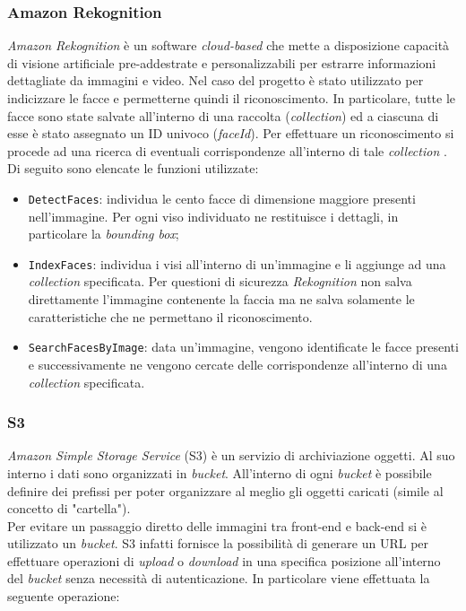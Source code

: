 	\subsubsection{Amazon Rekognition}
	
	\emph{Amazon Rekognition} è un software \emph{cloud-based} che mette a disposizione capacità di visione artificiale pre-addestrate e personalizzabili per estrarre informazioni dettagliate da immagini e video. Nel caso del progetto è stato utilizzato per indicizzare le facce e permetterne quindi il riconoscimento. In particolare, tutte le facce sono state salvate all'interno di una raccolta (\emph{collection}) ed a ciascuna di esse è stato assegnato un ID univoco (\emph{faceId}). Per effettuare un riconoscimento si procede ad una ricerca di eventuali corrispondenze all'interno di tale \emph{collection} . \\
	Di seguito sono elencate le funzioni utilizzate:
	\begin{itemize}
		\item \texttt{DetectFaces}: individua le cento facce di dimensione maggiore presenti nell'immagine. Per ogni viso individuato ne restituisce i dettagli, in particolare la \emph{bounding box};
		\item \texttt{IndexFaces}: individua i visi all'interno di un'immagine e li aggiunge ad una \emph{collection} specificata. Per questioni di sicurezza \emph{Rekognition} non salva direttamente l'immagine contenente la faccia ma ne salva solamente le caratteristiche che ne permettano il riconoscimento.
		\item \texttt{SearchFacesByImage}: data un'immagine, vengono identificate le facce presenti e successivamente ne vengono cercate delle corrispondenze all'interno di una \emph{collection} specificata.
		
	\end{itemize} 
	
	\subsubsection{S3}
	\emph{Amazon Simple Storage Service} (S3) è un servizio di archiviazione oggetti. Al suo interno i dati sono organizzati in \emph{bucket}. All'interno di ogni \emph{bucket} è possibile definire dei prefissi per poter organizzare al meglio gli oggetti caricati (simile al concetto di "cartella"). \\ 
	Per evitare un passaggio diretto delle immagini tra front-end e back-end si è utilizzato un \emph{bucket}. S3 infatti fornisce la possibilità di generare un URL per effettuare operazioni di \emph{upload} o \emph{download} in una specifica posizione all'interno del \emph{bucket} senza necessità di autenticazione. In particolare viene effettuata la seguente operazione:

